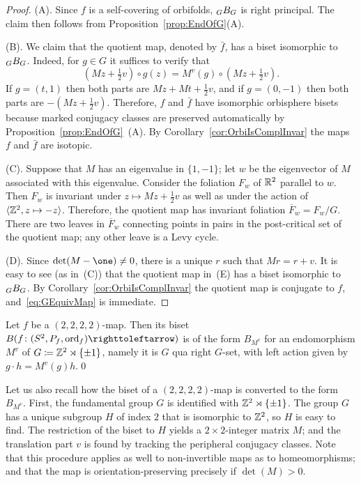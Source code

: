 \documentclass{amsart}
\begin{document}
\begin{proof}
  (A). Since $f$ is a self-covering of orbifolds, $\subscript G B_G$
  is right principal. The claim then follows from
  Proposition~\ref{prop:EndOfG}(A).

  (B). We claim that the quotient map, denoted by $\bar f$, has a
  biset isomorphic to $\subscript G B_G$. Indeed, for $g\in G$ it
  suffices to verify that
  \[(M z+\tfrac{1}{2}v) \circ g(z)= M^v(g)\circ  (M z+\tfrac{1}{2}v).
  \]
  If $g=(t,1)$ then both parts are $M z+M t+\frac{1}{2}v$, and if
  $g=(0,-1)$ then both parts are $-(M z+\frac{1}{2}v).$ Therefore, $f$
  and $\bar f$ have isomorphic orbisphere bisets because marked
  conjugacy classes are preserved automatically by Proposition~\ref{prop:EndOfG}~(A).  By
  Corollary~\ref{cor:OrbiIsComplInvar} the maps $f$ and $\bar f$ are
  isotopic.

  (C). Suppose that $M$ has an eigenvalue in $\{1,-1\}$; let $w$ be
  the eigenvector of $M$ associated with this eigenvalue. Consider the
  foliation $F_w$ of ${\mathbb R}^2$ parallel to $w$. Then $F_w$ is invariant
  under $z\mapsto M z+\frac{1}{2}v$ as well as under the action of
  $\langle {\mathbb Z}^2, z\mapsto -z \rangle$. Therefore, the quotient map has
  invariant foliation $\overline F_w= F_w/G$. There are two
  leaves in $\overline F_w$ connecting points in pairs in the
  post-critical set of the quotient map; any other leave is a Levy
  cycle.

  (D). Since $\det(M-\one)\neq0$, there is a unique $r$ such that
  $M r=r+v$.  It is easy to see (as in~(C)) that the quotient map
  in~(E) has a biset isomorphic to $\subscript G B_G$. By
  Corollary~\ref{cor:OrbiIsComplInvar} the quotient map is conjugate
  to $f$, and~\eqref{eq:GEquivMap} is immediate.
\end{proof}

\begin{cor}\label{cor:bis:2222}
  Let $f$ be a $(2,2,2,2)$-map. Then its biset
  $B(f\colon(S^2,P_f,\ord_f)\selfmap)$ is of the form $B_{M^v}$ for an
  endomorphism $M^v$ of $G\coloneqq{\mathbb Z}^2\rtimes\{\pm1\}$, namely it is
  $G$ qua right $G$-set, with left action given by $g\cdot h=M^v(g)h$.\qed
\end{cor}

Let us also recall how the biset of a $(2,2,2,2)$-map is converted
to the form $B_{M^v}$. First, the fundamental group $G$ is identified
with ${\mathbb Z}^2\rtimes\{\pm1\}$. The group $G$ has a unique subgroup $H$ of
index $2$ that is isomorphic to ${\mathbb Z}^2$, so $H$ is easy to find. The
restriction of the biset to $H$ yields a $2\times2$-integer matrix
$M$; and the translation part $v$ is found by tracking the peripheral
conjugacy classes. Note that this procedure applies as well to
non-invertible maps as to homeomorphisms; and that the map is
orientation-preserving precisely if $\det(M)>0$.
\end{document}
